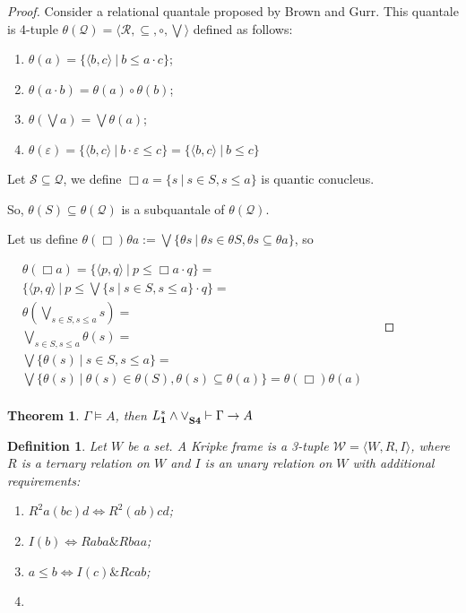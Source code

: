 \documentclass[a4paper]{article}
\theoremstyle{defin}
\newtheorem{defin}{Definition}
\theoremstyle{theorem}
\newtheorem{theorem}{Theorem}
\theoremstyle{prop}
\theoremstyle{lemma}
\theoremstyle{ex}
\theoremstyle{col}
\begin{document}
\begin{proof}
  Consider a relational quantale proposed by Brown and Gurr. This quantale is 4-tuple $\theta(\mathcal{Q}) = \langle \mathcal{R}, \subseteq, \circ, \bigvee \rangle$ defined as follows:
  \begin{enumerate}
    \item $\theta(a) = \{ \langle b, c \rangle \: | \: b \leq a \cdot c \}$;
    \item $\theta(a \cdot b) = \theta(a) \circ \theta(b)$;
    \item $\theta(\bigvee a) = \bigvee \theta(a)$;
    \item $\theta(\varepsilon) = \{ \langle b, c \rangle \: | \: b \cdot \varepsilon \leq c \} = \{ \langle b, c \rangle \: | \: b \leq c \}$
  \end{enumerate}

  Let $\mathcal{S} \subseteq \mathcal{Q}$, we define $\Box a = \{ s \: | \: s \in S, s \leq a \}$ is quantic conucleus.

  So, $\theta(S) \subseteq \theta(\mathcal{Q})$ is a subquantale of $\theta(\mathcal{Q})$.

  Let us define $\theta(\Box) \theta{a} := \bigvee \{ \theta{s} \: | \: \theta{s} \in \theta{S}, \theta{s} \subseteq \theta{a} \}$, so

  $\begin{array}{lll}
  &\theta(\Box a) = \{ \langle p, q \rangle \: | \: p \leq \Box a \cdot q \} = &\\
  &\{ \langle p, q \rangle \: | \: p \leq \bigvee \{ s \: | \: s \in S, s \leq a \} \cdot q \} = &\\
  &\theta(\bigvee_{s \in S, s \leq a} s) = & \\
  &\bigvee_{s \in S, s \leq a} \theta(s) = & \\
  &\bigvee \{ \theta(s) \: | \: s \in S, s \leq a \} = & \\
  &\bigvee \{ \theta(s) \: | \: \theta(s) \in \theta(S), \theta(s) \subseteq \theta(a) \} = \theta(\Box) \theta(a)& \\
  \end{array}$

\end{proof}

\begin{theorem}
  $\Gamma \models A$, then ${L^{*}_{\bf 1} \land \lor}_{\bf S4} \vdash \Gamma \rightarrow A$
\end{theorem}

\begin{defin}
  Let $W$ be a set. A Kripke frame is a 3-tuple $\mathcal{W} = \langle W, R, I\rangle$,
  where $R$ is a ternary relation on $W$ and $I$ is an unary relation on $W$ with additional requirements:

\begin{enumerate}
    \item $R^2 a (b c) d \Leftrightarrow R^2 (a b) c d$;
    \item $I(b) \Leftrightarrow R a b a \& R b a a$;
    \item $a \leq b \Leftrightarrow I(c) \& R c a b$;
    \item $ $
\end{enumerate}
\end{defin}
\end{document}
